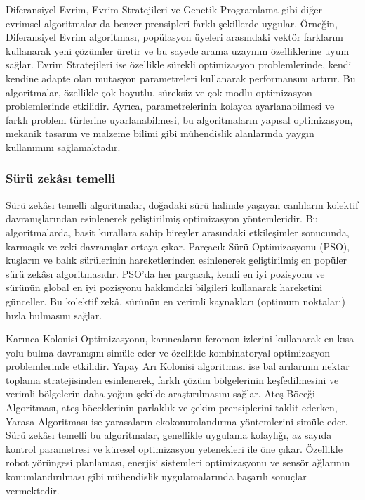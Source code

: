 Diferansiyel Evrim, Evrim Stratejileri ve Genetik Programlama gibi diğer evrimsel algoritmalar da benzer prensipleri farklı şekillerde uygular. Örneğin, Diferansiyel Evrim algoritması, popülasyon üyeleri arasındaki vektör farklarını kullanarak yeni çözümler üretir ve bu sayede arama uzayının özelliklerine uyum sağlar. Evrim Stratejileri ise özellikle sürekli optimizasyon problemlerinde, kendi kendine adapte olan mutasyon parametreleri kullanarak performansını artırır. Bu algoritmalar, özellikle çok boyutlu, süreksiz ve çok modlu optimizasyon problemlerinde etkilidir. Ayrıca, parametrelerinin kolayca ayarlanabilmesi ve farklı problem türlerine uyarlanabilmesi, bu algoritmaların yapısal optimizasyon, mekanik tasarım ve malzeme bilimi gibi mühendislik alanlarında yaygın kullanımını sağlamaktadır.

\subsubsection{Sürü zekâsı temelli}

Sürü zekâsı temelli algoritmalar, doğadaki sürü halinde yaşayan canlıların kolektif davranışlarından esinlenerek geliştirilmiş optimizasyon yöntemleridir. Bu algoritmalarda, basit kurallara sahip bireyler arasındaki etkileşimler sonucunda, karmaşık ve zeki davranışlar ortaya çıkar. Parçacık Sürü Optimizasyonu (PSO), kuşların ve balık sürülerinin hareketlerinden esinlenerek geliştirilmiş en popüler sürü zekâsı algoritmasıdır. PSO'da her parçacık, kendi en iyi pozisyonu ve sürünün global en iyi pozisyonu hakkındaki bilgileri kullanarak hareketini günceller. Bu kolektif zekâ, sürünün en verimli kaynakları (optimum noktaları) hızla bulmasını sağlar.

Karınca Kolonisi Optimizasyonu, karıncaların feromon izlerini kullanarak en kısa yolu bulma davranışını simüle eder ve özellikle kombinatoryal optimizasyon problemlerinde etkilidir. Yapay Arı Kolonisi algoritması ise bal arılarının nektar toplama stratejisinden esinlenerek, farklı çözüm bölgelerinin keşfedilmesini ve verimli bölgelerin daha yoğun şekilde araştırılmasını sağlar. Ateş Böceği Algoritması, ateş böceklerinin parlaklık ve çekim prensiplerini taklit ederken, Yarasa Algoritması ise yarasaların ekokonumlandırma yöntemlerini simüle eder. Sürü zekâsı temelli bu algoritmalar, genellikle uygulama kolaylığı, az sayıda kontrol parametresi ve küresel optimizasyon yetenekleri ile öne çıkar. Özellikle robot yörüngesi planlaması, enerjisi sistemleri optimizasyonu ve sensör ağlarının konumlandırılması gibi mühendislik uygulamalarında başarılı sonuçlar vermektedir.

